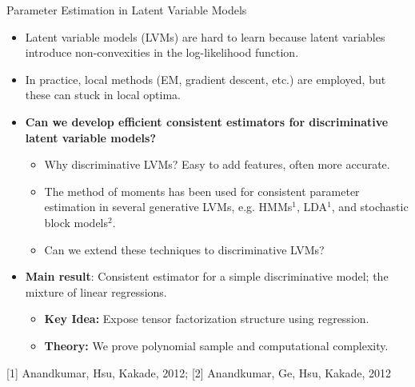 \begin{block}{Parameter Estimation in Latent Variable Models}
  \begin{center}
  \end{center}
  \vspace{-2ex}
  \begin{itemize}
    \item Latent variable models (LVMs) are hard to learn because latent
      variables introduce non-convexities in the log-likelihood
      function.
    \item In practice, local methods (EM, gradient descent, etc.) are
      employed, but these can stuck in local optima.
    \item {\bf Can we develop efficient consistent estimators for discriminative latent variable models?}
      \begin{itemize}
        \item Why discriminative LVMs? Easy to add features, often more accurate.
        \item The method of moments has been used for consistent parameter estimation in several generative LVMs, e.g. HMMs${}^1$, LDA${}^1$, and stochastic block models${}^2$.
        \item Can we extend these techniques to discriminative LVMs?
      \end{itemize}
    \item {\bf Main result}: Consistent estimator for a simple discriminative model; the mixture of linear regressions.
      \begin{itemize}
        \item {\bf Key Idea:} Expose tensor factorization structure using regression.
        \item {\bf Theory:} We prove polynomial sample and computational complexity.
      \end{itemize}
  \end{itemize}              
  \footnotesize{%
    \hfill
    [1] Anandkumar, Hsu, Kakade, 2012; [2] Anandkumar, Ge, Hsu, Kakade, 2012
    }
\end{block}


